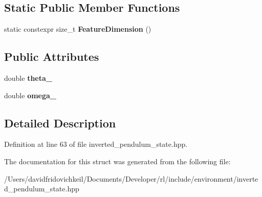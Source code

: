 \subsection*{Static Public Member Functions}
\begin{DoxyCompactItemize}
\item 
\hypertarget{structrl_1_1_inverted_pendulum_state_a683d833dbaaf81b26e89923b3348c152}{}\label{structrl_1_1_inverted_pendulum_state_a683d833dbaaf81b26e89923b3348c152} 
static constexpr size\+\_\+t {\bfseries Feature\+Dimension} ()
\end{DoxyCompactItemize}
\subsection*{Public Attributes}
\begin{DoxyCompactItemize}
\item 
\hypertarget{structrl_1_1_inverted_pendulum_state_a9fd734b2f30861433d5097f308a61607}{}\label{structrl_1_1_inverted_pendulum_state_a9fd734b2f30861433d5097f308a61607} 
double {\bfseries theta\+\_\+}
\item 
\hypertarget{structrl_1_1_inverted_pendulum_state_a1e787a04976dca05700d3d50d735cb36}{}\label{structrl_1_1_inverted_pendulum_state_a1e787a04976dca05700d3d50d735cb36} 
double {\bfseries omega\+\_\+}
\end{DoxyCompactItemize}


\subsection{Detailed Description}


Definition at line 63 of file inverted\+\_\+pendulum\+\_\+state.\+hpp.



The documentation for this struct was generated from the following file\+:\begin{DoxyCompactItemize}
\item 
/\+Users/davidfridovichkeil/\+Documents/\+Developer/rl/include/environment/inverted\+\_\+pendulum\+\_\+state.\+hpp\end{DoxyCompactItemize}
